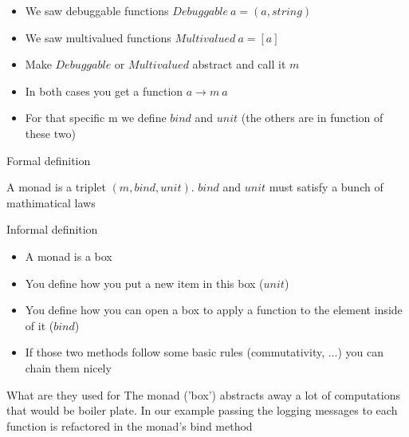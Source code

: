\begin{frame}[fragile]{}
    \begin{block}{}
        \begin{itemize}
            \item We saw debuggable functions $Debuggable \: a = (a, string)$
            \item We saw multivalued functions $Multivalued \: a = [a]$
            \item Make $Debuggable$ or $Multivalued$ abstract and call it $m$
            \item In both cases you get a function $a \rightarrow m \: a$
            \item For that specific m we define $bind$ and $unit$ (the others are in function of these two)
        \end{itemize}
    \end{block}
\end{frame}

\begin{frame}[fragile]{Formal definition}
    \begin{block}{}
        A monad is a triplet $(m, bind, unit)$. $bind$ and $unit$ must satisfy a bunch of mathimatical laws
    \end{block}
\end{frame}

\begin{frame}[fragile]{Informal definition}
    \begin{block}{}
        \begin{itemize}
            \item A monad is a box
            \item You define how you put a new item in this box ($unit$)
            \item You define how you can open a box to apply a function to the element inside of it ($bind$)
            \item If those two methods follow some basic rules (commutativity, ...) you can chain them nicely
        \end{itemize}
    \end{block}
\end{frame}

\begin{frame}[fragile]{}
    \begin{block}{What are they used for}
        The monad ('box') abstracts away a lot of computations that would be boiler plate.
        In our example passing the logging messages to each function is refactored in the monad's bind method
    \end{block}
\end{frame}


